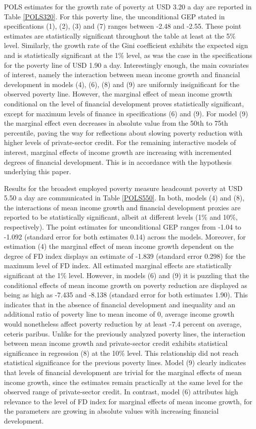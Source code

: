 \documentclass[12pt, a4paper]{article}
\begin{document}
POLS estimates for the growth rate of poverty at USD 3.20 a day are reported in Table \ref{POLS320}. For this poverty line, the unconditional GEP stated in specifications (1), (2), (3) and (7) ranges between -2.48 and -2.55. These point estimates are statistically significant throughout the table at least at the 5\% level. Similarly, the growth rate of the Gini coefficient exhibits the expected sign and is statistically significant at the 1\% level, as was the case in the specifications for the poverty line of USD 1.90 a day. Interestingly enough, the main covariates of interest, namely the interaction between mean income growth and financial development in models (4), (6), (8) and (9) are uniformly insignificant for the observed poverty line. However, the marginal effect of mean income growth conditional on the level of financial development proves statistically significant, except for maximum levels of finance in specifications (6) and (9). For model (9) the marginal effect even decreases in absolute value from the 50th to 75th percentile, paving the way for reflections about slowing poverty reduction with higher levels of private-sector credit. For the remaining interactive models of interest, marginal effects of income growth are increasing with incremented degrees of financial development. This is in accordance with the hypothesis underlying this paper.

Results for the broadest employed poverty measure headcount poverty at USD 5.50 a day are communicated in Table \ref{POLS550}. In both, models (4) and (8), the interactions of mean income growth and financial development proxies are reported to be statistically significant, albeit at different levels (1\% and 10\%, respectively). The point estimates for unconditional GEP ranges from -1.04 to -1.092 (standard error for both estimates 0.14) across the models. Moreover, for estimation (4) the marginal effect of mean income growth dependent on the degree of FD index displays an estimate of -1.839 (standard error 0.298) for the maximum level of FD index. All estimated marginal effects are statistically significant at the 1\% level. However, in models (6) and (9) it is puzzling that the conditional effects of mean income growth on poverty reduction are displayed as being as high as -7.435 and -8.138 (standard error for both estimates 1.90). This indicates that in the absence of financial development and inequality and an additional ratio of poverty line to mean income of 0, average income growth would nonetheless affect poverty reduction by at least -7.4 percent on average, ceteris paribus. Unlike for the previously analyzed poverty lines, the interaction between mean income growth and private-sector credit exhibits statistical significance in regression (8) at the 10\% level. This relationship did not reach statistical significance for the previous poverty lines. Model (9) clearly indicates that levels of financial development are trivial for the marginal effects of mean income growth, since the estimates remain practically at the same level for the observed range of private-sector credit. In contrast, model (6) attributes high relevance to the level of FD index for marginal effects of mean income growth, for the parameters are growing in absolute values with increasing financial development.
\end{document}
